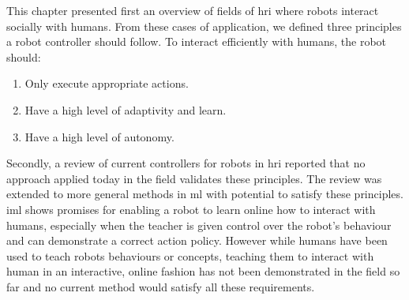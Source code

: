 This chapter presented first an overview of fields of \gls{hri} where robots interact socially with humans. From these cases of application, we defined three principles a robot controller should follow. To interact efficiently with humans, the robot should:
\begin{enumerate}
   	\item Only execute appropriate actions.
   	\item Have a high level of adaptivity and learn.
   	\item Have a high level of autonomy.
\end{enumerate}

Secondly, a review of current controllers for robots in \gls{hri} reported that no approach applied today in the field validates these principles. The review was extended to more general methods in \gls{ml} with potential to satisfy these principles. \gls{iml} shows promises for enabling a robot to learn online how to interact with humans, especially when the teacher is given control over the robot's behaviour and can demonstrate a correct action policy. However while humans have been used to teach robots behaviours or concepts, teaching them to interact with human in an interactive, online fashion has not been demonstrated in the field so far and no current method would satisfy all these requirements.